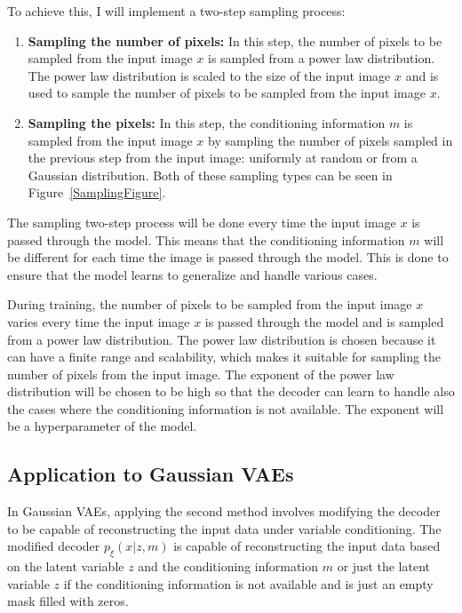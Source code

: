 To achieve this, I will implement a two-step sampling process:

\begin{enumerate}
    \item \textbf{Sampling the number of pixels:} In this step, the number of pixels to be sampled from the input image $x$ is sampled from a power law distribution. The power law distribution is scaled to the size of the input image $x$ and is used to sample the number of pixels to be sampled from the input image $x$.
    \item \textbf{Sampling the pixels:} In this step, the conditioning information $m$ is sampled from the input image $x$ by sampling the number of pixels sampled in the previous step from the input image: uniformly at random or from a Gaussian distribution. Both of these sampling types can be seen in Figure~\ref{SamplingFigure}.
\end{enumerate}

The sampling two-step process will be done every time the input image $x$ is passed through the model. This means that the conditioning information $m$ will be different for each time the image is passed through the model. This is done to ensure that the model learns to generalize and handle various cases.

During training, the number of pixels to be sampled from the input image $x$ varies every time the input image $x$ is passed through the model and is sampled from a power law distribution.
The power law distribution is chosen because it can have a finite range and scalability, which makes it suitable for sampling the number of pixels from the input image. The exponent of the power law distribution will be chosen to be high so that the decoder can learn to handle also the cases where the conditioning information is not available. The exponent will be a hyperparameter of the model.


\subsection{Application to Gaussian VAEs}

In Gaussian VAEs, applying the second method involves modifying the decoder to
be capable of reconstructing the input data under variable conditioning. The
modified decoder $p_\xi(x|z,m)$ is capable of reconstructing the input data
based on the latent variable $z$ and the conditioning information $m$ or just
the latent variable $z$ if the conditioning information is not available and is just an empty mask filled with zeros.


